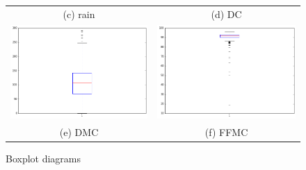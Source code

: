 \begin{figure}
\begin{tabular}{cc}
(c) rain & (d) DC \\[6pt]
  \includegraphics[width=65mm]{images/boxplots/DMC.png} &   \includegraphics[width=65mm]{images/boxplots/FFMC.png} \\
(e) DMC & (f) FFMC \\[6pt]
\end{tabular}
\caption{Boxplot diagrams}
\end{figure}

